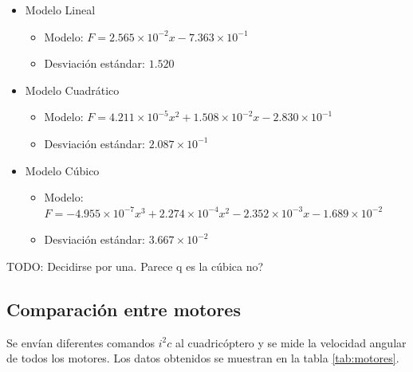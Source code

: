 \documentclass[spanish,12pt,a4paper,titlepage]{report}
\begin{document}
\begin{itemize}
\item Modelo Lineal
	\begin{itemize}
	\item Modelo: $F=2.565\times 10^{-2}x-7.363\times 10^{-1}$
	\item Desviación estándar: $1.520$
	\end{itemize}
\item Modelo Cuadrático
	\begin{itemize}
	\item Modelo: $F=4.211\times 10^{-5}x^2+1.508\times 10^{-2}x-2.830\times 10^{-1}$
	\item Desviación estándar: $2.087\times 10^{-1}$
	\end{itemize}
\item Modelo Cúbico
	\begin{itemize}
	\item Modelo: $F=-4.955\times 10^{-7}x^3+2.274\times 10^{-4}x^2-2.352\times 10^{-3}x- 1.689\times 10^{-2}$
	\item Desviación estándar: $3.667\times 10^{-2}$
	\end{itemize}		
\end{itemize}

TODO: Decidirse por una. Parece q es la cúbica no?


\subsection{Comparación entre motores}
\label{sec:motores}
Se envían diferentes comandos $i^2c$ al cuadricóptero y se mide la velocidad angular de todos los motores. Los datos obtenidos se muestran en la tabla \ref{tab:motores}.
\end{document}
